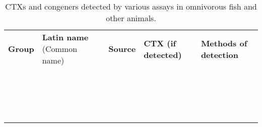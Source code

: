 \documentclass[12pt]{article}
\begin{document}
\begin{table}
\caption{CTXs and congeners detected by various assays in omnivorous fish and other animals.}
\label{tbl:OmniTable}
\begin{tabular}{ p{2cm} p{3cm}  p{4.5cm}  p{2cm}  p{3cm}  }
\textbf{Group} & \textbf{Latin name} (Common name) & \textbf{Source} & \textbf{CTX (if detected)} & \textbf{Methods of detection} \\
  &  \emph{} &  &  & \\
  & \emph{}  &  &  & \\
  & \emph{} &  &  & \\
  &  \emph{} &  &  & \\
  & \emph{}  &  &  & \\
  & \emph{} &  &  & \\
  &  \emph{} &  &  & \\
  & \emph{}  &  &  & \\
  & \emph{} &  &  & \\
  &  \emph{} &  &  & \\
  & \emph{}  &  &  & \\
  & \emph{} &  &  & \\
  &  \emph{} &  &  & \\
  & \emph{}  &  &  & \\
  & \emph{} &  &  & \\
  &  \emph{} &  &  & \\
  & \emph{}  &  &  & \\
  & \emph{} &  &  & \\
\end{tabular}
\end{table}
\end{document}
